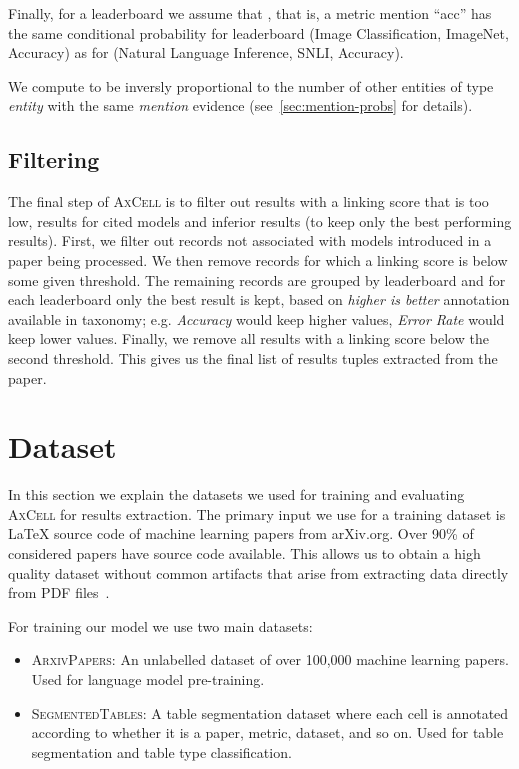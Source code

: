 \documentclass[11pt,a4paper]{article}
\newcommand{\model}{\textsc{AxCell}}
\newcommand{\unlabeled}{\textsc{ArxivPapers}}
\newcommand{\finegrained}{\textsc{SegmentedTables}}
\newcommand{\arxiv}{arXiv.org}
\begin{document}
Finally, for a leaderboard  we assume that , that is, a metric mention ``acc'' has the same conditional probability for leaderboard (Image Classification, ImageNet, Accuracy) as for (Natural Language Inference, SNLI, Accuracy).


We compute  to be inversly proportional to the number of other entities of type \textit{entity} with the same \textit{mention} evidence (see~\cref{sec:mention-probs} for details).


\subsection{Filtering}
The final step of \model{} is to filter out results with a linking score that is too low, results for cited models and inferior results (to keep only the best performing results). First, we filter out records not associated with models introduced in a paper being processed. We then remove records for which a linking score is below some given threshold. The remaining records are grouped by leaderboard and for each leaderboard only the best result is kept, based on \textit{higher is better} annotation available in taxonomy; e.g. \textit{Accuracy} would keep higher values, \textit{Error Rate} would keep lower values. Finally, we remove all results with a linking score below the second threshold. This gives us the final list of results tuples extracted from the paper.
 

\section{Dataset}
\label{sec:dataset}

In this section we explain the datasets we used for training and evaluating \model{} for results extraction. The primary input we use for a training dataset is \LaTeX{} source code of machine learning papers from \arxiv{}. Over 90\% of considered papers have source code available. This allows us to obtain a high quality dataset without common artifacts that arise from extracting data directly from PDF files~\cite{ibm-extraction}.

For training our model we use two main datasets:

\begin{itemize}
  \item \unlabeled{}: An unlabelled dataset of over 100,000 machine learning papers. Used for language model pre-training.
  \item \finegrained{}: A table segmentation dataset where each cell is annotated according to whether it is a paper, metric, dataset, and so on. Used for table segmentation and table type classification.
\end{itemize}
\end{document}
